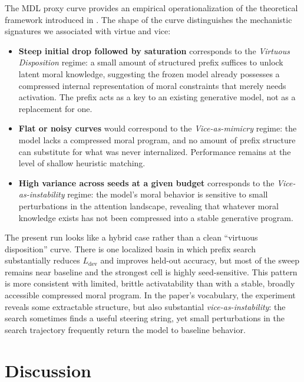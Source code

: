 \documentclass[preprint]{article}
\newcommand{\Ldev}{L_{\text{dev}}}
\begin{document}
The MDL proxy curve provides an empirical operationalization of the theoretical framework introduced in . The shape of the curve distinguishes the mechanistic signatures we associated with virtue and vice:

\begin{itemize}
    \item \textbf{Steep initial drop followed by saturation} corresponds to the \emph{Virtuous Disposition} regime: a small amount of structured prefix suffices to unlock latent moral knowledge, suggesting the frozen model already possesses a compressed internal representation of moral constraints that merely needs activation. The prefix acts as a key to an existing generative model, not as a replacement for one.
    \item \textbf{Flat or noisy curves} would correspond to the \emph{Vice-as-mimicry} regime: the model lacks a compressed moral program, and no amount of prefix structure can substitute for what was never internalized. Performance remains at the level of shallow heuristic matching.
    \item \textbf{High variance across seeds at a given budget} corresponds to the \emph{Vice-as-instability} regime: the model's moral behavior is sensitive to small perturbations in the attention landscape, revealing that whatever moral knowledge exists has not been compressed into a stable generative program.
\end{itemize}

The present run looks like a hybrid case rather than a clean ``virtuous disposition'' curve.
There is one localized basin in which prefix search substantially reduces $\Ldev$ and improves held-out accuracy, but most of the sweep remains near baseline and the strongest cell is highly seed-sensitive.
This pattern is more consistent with limited, brittle activatability than with a stable, broadly accessible compressed moral program.
In the paper's vocabulary, the experiment reveals some extractable structure, but also substantial \emph{vice-as-instability}: the search sometimes finds a useful steering string, yet small perturbations in the search trajectory frequently return the model to baseline behavior.

\section{Discussion}
\label{sec:discussion}
\end{document}

